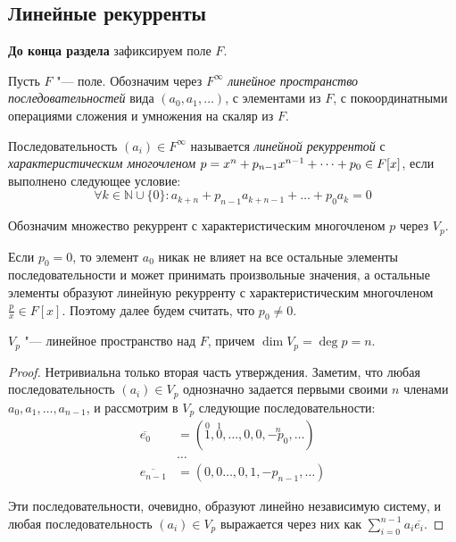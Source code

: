 \subsection{Линейные рекурренты}

\textbf{До конца раздела} зафиксируем поле $F$.

\begin{definition}
	Пусть $F$ "--- поле. Обозначим через $F^{\infty}$ \textit{линейное пространство последовательностей} вида $(a_0, a_1, \dots)$, с элементами из $F$, с покоординатными операциями сложения и умножения на скаляр из $F$.
\end{definition}

\begin{definition}
	Последовательность $(a_i) \in F^{\infty}$ называется \textit{линейной рекуррентой} с \textit{характеристическим многочленом} $p = x^n + p_{n - 1}x^{n - 1} \hm{+} \dots + p_0 \in F[x]$, если выполнено следующее условие:
	\begin{equation}\tag{$\dagger$}\label{linrec}
		\forall k \in \mathbb{N} \cup \{0\}: a_{k + n} + p_{n - 1}a_{k + n - 1} + \dots + p_0a_k = 0
	\end{equation}
	
	Обозначим множество рекуррент с характеристическим многочленом $p$ через $V_p$.
\end{definition}

\begin{note}
	Если $p_0 = 0$, то элемент $a_0$ никак не влияет на все остальные элементы последовательности и может принимать произвольные значения, а остальные элементы образуют линейную рекурренту с характеристическим многочленом $\frac{p}{x} \in F[x]$. Поэтому далее будем считать, что $p_0 \ne 0$.
\end{note}

\begin{proposition}
	$V_p$ "--- линейное пространство над $F$, причем $\dim{V_p} = \deg{p} = n$.
\end{proposition}

\begin{proof}
	Нетривиальна только вторая часть утверждения. Заметим, что любая последовательность $(a_i) \in V_p$ однозначно задается первыми своими $n$ членами $a_0, a_1, \dots, a_{n - 1}$, и рассмотрим в $V_p$ следующие последовательности:
	\begin{align*}
		\overline{e_0} &= (\overset{0}{1}, \overset{1}{0}, \dotsc, 0, 0, \overset{n}{-p_0}, \dots)\\
		&\dotsc\\
		\overline{e_{n - 1}} &= (0, 0\dotsc, 0, 1, -p_{n - 1}, \dots)
	\end{align*}
	
	Эти последовательности, очевидно, образуют линейно независимую систему, и любая последовательность $(a_i) \in V_p$ выражается через них как $\sum_{i = 0}^{n - 1}a_i\overline{e_i}$.
\end{proof}

